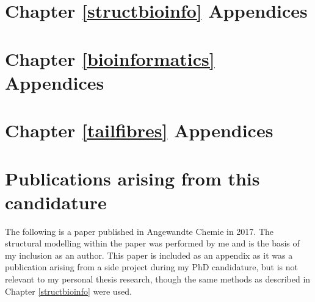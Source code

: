 \documentclass[a4paper, oneside, 11pt]{report} %
\begin{document}
\begin{appendices}
\chapter{Chapter \ref{structbioinfo} Appendices}

\chapter{Chapter \ref{bioinformatics} Appendices}
%

\chapter{Chapter \ref{tailfibres} Appendices}



\chapter{Publications arising from this candidature}
The following is a paper published in Angewandte Chemie in 2017. The structural modelling within the paper was performed by me and is the basis of my inclusion as an author. This paper is included as an appendix as it was a publication arising from a side project during my PhD candidature, but is not relevant to my personal thesis research, though the same methods as described in Chapter \ref{structbioinfo} were used.

%


\end{appendices}
\end{document}
